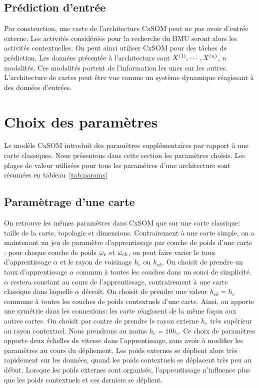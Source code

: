 \subsection{Prédiction d'entrée}
Par construction, une carte de l'architecture CxSOM peut ne pas avoir d'entrée externe. Les activités considérées pour la recherche du BMU seront alors les activités contextuelles. On peut ainsi utiliser CxSOM pour des tâches de prédiction. Les données présentée à l'architecture sont $X^{({1})}, \cdots, X^{({n})}$, $n$ modalités. Ces modalités portent de l'information les unes sur les autres. 
L'architecture de cartes peut être vue comme un système dynamique réagissant à des données d'entrées.


\section{Choix des paramètres}\label{sec:params}

Le modèle CxSOM introduit des paramètres supplémentaires par rapport à une carte classiques. Nous présentons dans cette section les paramètres choisis. Les plages de valeur utilisées pour tous les paramètres d'une architecture sont résumées en tableau~\ref{tab:params}
\subsection{Paramètrage d'une carte}
On retrouve les mêmes paramètres dans CxSOM que sur une carte classique: taille de la carte, topologie et dimensions. 
Contrairement à une carte simple, on a maintenant un jeu de paramètre d'apprentissage par couche de poids d'une carte : pour chaque couche de poids $\omega_e$ et $\omega_{ck}$, on peut faire varier le taux d'apprentissage $\alpha$ et le rayon de voisinage $h_e$ ou $h_{ck}$.
On choisit de prendre un taux d'apprentissage $\alpha$ commun à toutes les couches dans un souci de simplicité. $\alpha$ restera constant au cours de l'apprentissage, contrairement à une carte classique dans laquelle $\alpha$ décroît.
On choisit de prendre une valeur $h_{ck} = h_c$ commune à toutes les couches de poids contextuels d'une carte. Ainsi, on apporte une symétrie dans les connexions: les carte réagissent de la même façon aux autres cartes.
On choisit par contre de prendre le rayon externe $h_e$ très supérieur au rayon contextuel. Nous prendrons au moins $h_e = 10 h_c$. Ce choix de paramètres apporte deux échelles de vitesse dans l'apprentissage, sans avoir à modifier les paramètres au cours du dépliement. Les poids externes se déplient alors très rapidement sur les données, quand les poids contextuels se déplacent très peu au début. Lorsque les poids externes sont organisés, l'apprentissage n'influence plus que les poids contextuels et ces derniers se déplient. 


